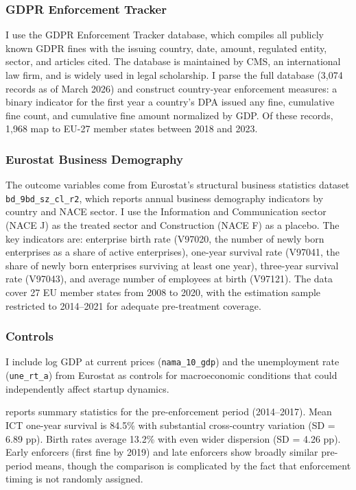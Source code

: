 \documentclass[12pt]{article}
\begin{document}
\subsubsection*{GDPR Enforcement Tracker} I use the GDPR Enforcement Tracker database, which compiles all publicly known GDPR fines with the issuing country, date, amount, regulated entity, sector, and articles cited. The database is maintained by CMS, an international law firm, and is widely used in legal scholarship. I parse the full database (3,074 records as of March 2026) and construct country-year enforcement measures: a binary indicator for the first year a country's DPA issued any fine, cumulative fine count, and cumulative fine amount normalized by GDP. Of these records, 1,968 map to EU-27 member states between 2018 and 2023.

\subsubsection*{Eurostat Business Demography} The outcome variables come from Eurostat's structural business statistics dataset \texttt{bd\_9bd\_sz\_cl\_r2}, which reports annual business demography indicators by country and NACE sector. I use the Information and Communication sector (NACE J) as the treated sector and Construction (NACE F) as a placebo. The key indicators are: enterprise birth rate (V97020, the number of newly born enterprises as a share of active enterprises), one-year survival rate (V97041, the share of newly born enterprises surviving at least one year), three-year survival rate (V97043), and average number of employees at birth (V97121). The data cover 27 EU member states from 2008 to 2020, with the estimation sample restricted to 2014--2021 for adequate pre-treatment coverage.

\subsubsection*{Controls} I include log GDP at current prices (\texttt{nama\_10\_gdp}) and the unemployment rate (\texttt{une\_rt\_a}) from Eurostat as controls for macroeconomic conditions that could independently affect startup dynamics.



 reports summary statistics for the pre-enforcement period (2014--2017). Mean ICT one-year survival is 84.5\% with substantial cross-country variation (SD = 6.89 pp). Birth rates average 13.2\% with even wider dispersion (SD = 4.26 pp). Early enforcers (first fine by 2019) and late enforcers show broadly similar pre-period means, though the comparison is complicated by the fact that enforcement timing is not randomly assigned.
\end{document}
